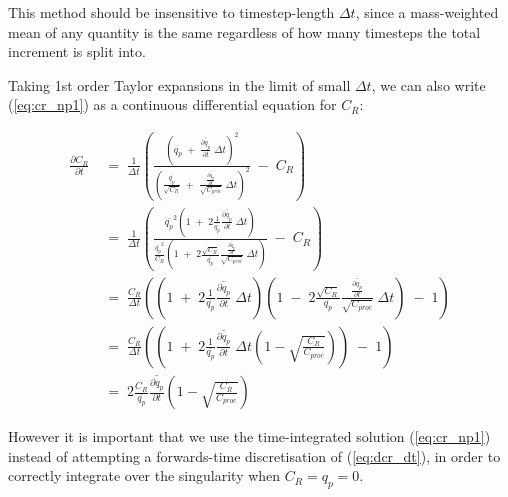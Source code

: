 \documentclass{UMDP_article}
\begin{document}
This method should be insensitive to timestep-length $\Delta t$,
since a mass-weighted mean of any quantity is the same regardless of how many
timesteps the total increment is split into.

Taking 1st order Taylor expansions in the limit of small $\Delta t$,
we can also write (\ref{eq:cr_np1}) as a continuous differential equation
for $C_R$:

\begin{align}
\frac{\partial C_R}{\partial t}
& \; = \;
\frac{1}{\Delta t} \left(
  \frac{ \left( \overline{ q_p }
        \; + \; \overline{ \frac{\partial q_p}{\partial t} } \; \Delta t
         \right)^2 }
       { \left( \frac{ \overline{q_p} }{ \sqrt{ C_R } }
          \; + \; \frac{ \overline{\frac{\partial q_p}{\partial t}} }
                       { \sqrt{ C_{proc} } } \; \Delta t
          \right)^2 }
 \; - \; C_R \right)
\nonumber \\
& \; = \;
\frac{1}{\Delta t} \left(
  \frac{ \overline{ q_p }^2 \left( 1
        \; + \; 2 \frac{1}{\overline{ q_p }}
                  \overline{ \frac{\partial q_p}{\partial t} } \; \Delta t
         \right) }
       { \frac{ \overline{q_p}^2 }{ C_R } \left( 1
          \; + \; 2 \frac{ \sqrt{ C_R } }{ \overline{q_p} }
                    \frac{ \overline{\frac{\partial q_p}{\partial t}} }
                         { \sqrt{ C_{proc} } } \; \Delta t
          \right) }
 \; - \; C_R \right)
\nonumber \\
& \; = \;
\frac{C_R}{\Delta t} \left(
  \left( 1 \; + \; 2 \frac{1}{\overline{ q_p }}
                     \overline{ \frac{\partial q_p}{\partial t} } \; \Delta t
  \right)
  \left( 1 \; - \; 2 \frac{ \sqrt{ C_R } }{ \overline{q_p} }
                     \frac{ \overline{\frac{\partial q_p}{\partial t}} }
                          { \sqrt{ C_{proc} } } \; \Delta t
  \right)
 \; - \; 1 \right)
\nonumber \\
& \; = \;
\frac{C_R}{\Delta t} \left(
  \left( 1 \; + \; 2 \frac{1}{\overline{ q_p }}
                     \overline{ \frac{\partial q_p}{\partial t} } \; \Delta t
                     \left( 1 - \sqrt{\frac{ C_R }{ C_{proc} }} \right)
  \right)
 \; - \; 1 \right)
\nonumber \\
& \; = \; 2 \frac{C_R}{\overline{ q_p }}
          \overline{ \frac{\partial q_p}{\partial t} }
          \left( 1 - \sqrt{\frac{ C_R }{ C_{proc} }} \right)
\label{eq:dcr_dt}
\end{align}

However it is important that we use the time-integrated solution
(\ref{eq:cr_np1}) instead of attempting a forwards-time discretisation
of (\ref{eq:dcr_dt}), in order to correctly integrate over the singularity
when $C_R = q_p = 0$.
\end{document}

